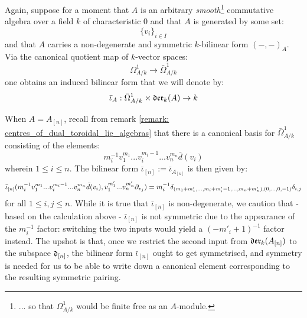         \begin{remark} \label{remark: pairing_cyclic_1_forms_and_div_zero_vector_fields} 
            Again, suppose for a moment that $A$ is an arbitrary \textit{smooth}\footnote{... so that $\Omega^1_{A/k}$ would be finite free as an $A$-module.} commutative algebra over a field $k$ of characteristic $0$ and that $A$ is generated by some set:
                $$\{v_i\}_{i \in I}$$
            and that $A$ carries a non-degenerate and symmetric $k$-bilinear form $(-, -)_A$. Via the canonical quotient map of $k$-vector spaces:
                $$\Omega^1_{A/k} \to \bar{\Omega}^1_{A/k}$$
            one obtains an induced bilinear form that we will denote by:
                $$\bar{\iota}_A: \bar{\Omega}^1_{A/k} \x \der_k(A) \to k$$

            When $A = A_{[n]}$, recall from remark \ref{remark: centres_of_dual_toroidal_lie_algebras} that there is a canonical basis for $\bar{\Omega}^1_{A/k}$ consisting of the elements:
                $$m_i^{-1} v_1^{m_1} ... v_i^{m_i - 1} ... v_n^{m_n} \bar{d}(v_i)$$
            wherein $1 \leq i \leq n$. The bilinear form $\bar{\iota}_{[n]} := \bar{\iota}_{A_{[n]}}$ is then given by:
                $$\bar{\iota}_{[n]}( m_i^{-1} v_1^{m_1} ... v_i^{m_i - 1} ... v_n^{m_n} \bar{d}(v_i), v_1^{m_1'} ... v_n^{m_n'} \partial_{v_j} ) = m_i^{-1} \delta_{(m_1 + m_1', ..., m_i + m_i' - 1, ..., m_n + m_n'), (0, ..., 0, -1)} \delta_{i, j}$$
            for all $1 \leq i, j \leq n$. While it is true that $\bar{\iota}_{[n]}$ is non-degenerate, we caution that - based on the calculation above - $\bar{\iota}_{[n]}$ is not symmetric due to the appearance of the $m_i^{-1}$ factor: switching the two inputs would yield a $(-m'_i + 1)^{-1}$ factor instead. The upshot is that, once we restrict the second input from $\mathfrak{der}_k(A_{[n]})$ to the  subspace $\mathfrak{d}_{[n]}$, the bilinear form $\bar{\iota}_{[n]}$ ought to get symmetrised, and symmetry is needed for us to be able to write down a canonical element corresponding to the resulting symmetric pairing.


\end{remark}
